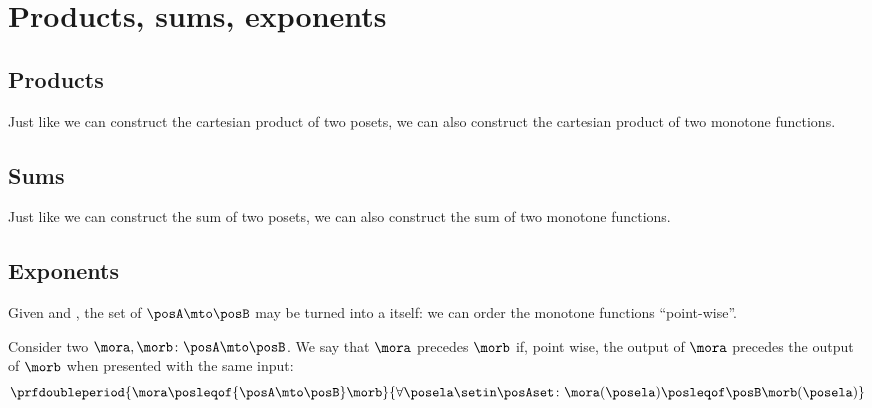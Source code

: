 
\section{Products, sums, exponents}

\subsection{Products}

Just like we can construct the cartesian product of two posets, we can also construct the cartesian product of two monotone functions.



\subsection{Sums}

Just like we can construct the sum of two posets, we can also construct the sum of two monotone functions.


\subsection{Exponents}


Given  \posA and \posB, the set of  $\posA \mto \posB$ may be turned into a  itself: we can order the monotone functions ``point-wise''.

\begin{ctdefinition}
    \label{def:order-monotone-maps}
    Consider two  $\mora,\morb\colon\posA\mto\posB$.
    We say that $\mora$ precedes $\morb$ if, point wise, the output of $\mora$ precedes the output of $\morb$ when presented with the same input:
    \begin{equation}
        \prfdoubleperiod{
            \mora \posleqof{\posA\mto\posB} \morb
        }{
            \forall \posela\setin\posAset \colon \mora(\posela) \posleqof\posB \morb(\posela)
        }
    \end{equation}
\end{ctdefinition}

